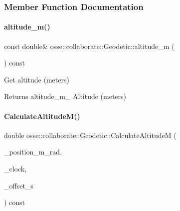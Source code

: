 \subsubsection{Member Function Documentation}
\mbox{\label{classosse_1_1collaborate_1_1_geodetic_a4c166387a76e142c6bb500b0e34dc782}} 
\paragraph{\texorpdfstring{altitude\+\_\+m()}{altitude\_m()}}
{\footnotesize\ttfamily const double\& osse\+::collaborate\+::\+Geodetic\+::altitude\+\_\+m (\begin{DoxyParamCaption}{ }\end{DoxyParamCaption}) const\hspace{0.3cm}{\ttfamily [inline]}}



Get altitude (meters) 

\begin{DoxyReturn}{Returns}
altitude\+\_\+m\+\_\+ Altitude (meters) 
\end{DoxyReturn}
\mbox{\label{classosse_1_1collaborate_1_1_geodetic_a9720fc55eb736812b81de9bfabb1d541}} 
\paragraph{\texorpdfstring{Calculate\+Altitude\+M()}{CalculateAltitudeM()}}
{\footnotesize\ttfamily double osse\+::collaborate\+::\+Geodetic\+::\+Calculate\+AltitudeM (\begin{DoxyParamCaption}\item[{const \hyperlink{classosse_1_1collaborate_1_1_vector}{Vector} \&}]{\+\_\+position\+\_\+m\+\_\+rad,  }\item[{const \hyperlink{classosse_1_1collaborate_1_1_simulation_clock}{Simulation\+Clock} \&}]{\+\_\+clock,  }\item[{const uint64\+\_\+t \&}]{\+\_\+offset\+\_\+s }\end{DoxyParamCaption}) const\hspace{0.3cm}{\ttfamily [private]}}



